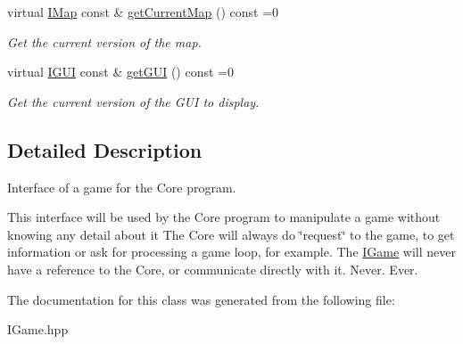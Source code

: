 \begin{DoxyCompactItemize}
\mbox{\label{classarcade_1_1IGame_a2e1791071bf65ee35e249e409ee29044}} 
virtual \hyperlink{classarcade_1_1IMap}{I\+Map} const  \& \hyperlink{classarcade_1_1IGame_a2e1791071bf65ee35e249e409ee29044}{get\+Current\+Map} () const =0
\begin{DoxyCompactList}\small\item\em Get the current version of the map. \end{DoxyCompactList}\item 
\mbox{\label{classarcade_1_1IGame_a577815e0d2c32808bcce406dde414b9d}} 
virtual \hyperlink{classarcade_1_1IGUI}{I\+G\+UI} const  \& \hyperlink{classarcade_1_1IGame_a577815e0d2c32808bcce406dde414b9d}{get\+G\+UI} () const =0
\begin{DoxyCompactList}\small\item\em Get the current version of the G\+UI to display. \end{DoxyCompactList}\end{DoxyCompactItemize}


\subsection{Detailed Description}
Interface of a game for the Core program. 

This interface will be used by the Core program to manipulate a game without knowing any detail about it The Core will always do \char`\"{}request\char`\"{} to the game, to get information or ask for processing a game loop, for example. The \hyperlink{classarcade_1_1IGame}{I\+Game} will never have a reference to the Core, or communicate directly with it. Never. Ever. 

The documentation for this class was generated from the following file\+:\begin{DoxyCompactItemize}
\item 
I\+Game.\+hpp\end{DoxyCompactItemize}
